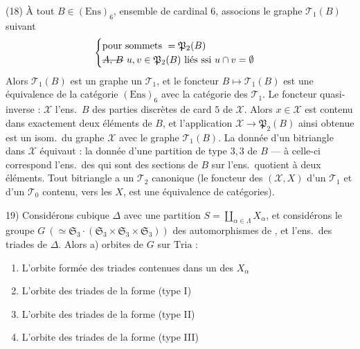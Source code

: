 \documentclass[11pt,a4paper]{article}
\begin{document}
(18) À tout $B \in (\mathrm{Ens})_6$, ensemble de cardinal $6$,
associons le graphe $\mathcal{T}_1(B)$ suivant
\[
\begin{cases}
\text{pour sommets } = \mathfrak{P}_2(B)\\
\text{\struck{$A$, $B$}} \ u, v \in \mathfrak{P}_2(B) \text{ liés ssi } u \cap v = \emptyset
\end{cases}
\]
Alors $\mathcal{T}_1(B)$ est un graphe  
un $\mathcal{T}_1$, et le foncteur $B \mapsto \mathcal{T}_1(B)$ est
une équivalence de la catégorie $(\mathrm{Ens})_6$ avec
la catégorie des $\mathcal{T}_1$. Le foncteur quasi-inverse
 : $\mathcal{X}$ l'ens.\ $B$ des
parties discrètes de card $5$ de $\mathcal{X}$. Alors \ill{}
$x \in \mathcal{X}$ est contenu dans exactement deux
éléments de $B$, et l'application $\mathcal{X} \to \mathfrak{P}_2(B)$
ainsi obtenue est un isom.\ du graphe
$\mathcal{X}$ avec le graphe $\mathcal{T}_1(B)$. La donnée d'un
bitriangle dans $\mathcal{X}$ équivaut : la donnée
d'une partition de type $3,3$ de $B$
--- à celle-ci correspond l'ens.\ des \struck{\ill{}} 
qui sont des sections de $B$ sur l'ens.\ quotient
à deux éléments. Tout bitriangle a un
$\mathcal{T}_2$  canonique (le foncteur
des $(\mathcal{X}, X)$ d'un $\mathcal{T}_1$ et d'un $\mathcal{T}_0$ contenu,
vers les $X$, est une équivalence de catégories).

19) Considérons \struck{\ill{}}  cubique $\Delta$ avec une partition
 $S = \coprod_{\alpha\in\Lambda} X_\alpha$, et considérons le groupe
$G\ (\simeq \mathfrak{S}_3 \cdot (\mathfrak{S}_3 \times \mathfrak{S}_3 \times \mathfrak{S}_3))$ des automorphismes de
 , \struck{\ill{}} et   
 l'ens.\ des triades de $\Delta$. Alors 
a)     orbites de $G$ sur $\mathrm{Tria}$ :
  \begin{enumerate}
  \item[1°)] L'orbite formée des triades contenues
  \ill{} dans un des $X_\alpha$
  \item[2°)] L'orbite  des triades de la forme
   (type I)
  \item[3°)] L'orbite  des triades de la forme
   (type II)
  \item[4°)] L'orbite des triades de la forme
   (type III)
  \end{enumerate}
\end{document}
